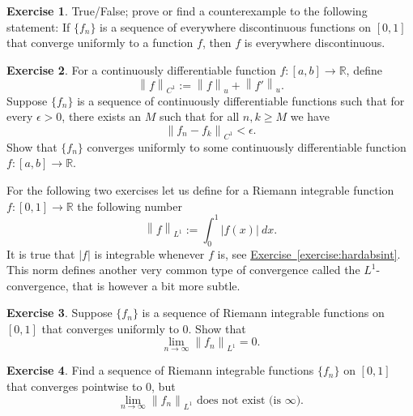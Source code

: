 \documentclass[12pt]{book}
\newcommand{\abs}[1]{\left\lvert {#1} \right\rvert}
\newcommand{\norm}[1]{\left\lVert {#1} \right\rVert}
\newcommand{\R}{{\mathbb{R}}}
\theoremstyle{plain}
\theoremstyle{remark}
\theoremstyle{definition}
\newenvironment{exnote}{\small}{}
\theoremstyle{exercise}
\newtheorem{exercise}{Exercise}[section]
\theoremstyle{example}
\newcommand{\exerciseref}[1]{\hyperref[#1]{Exercise~\ref*{#1}}}
\begin{document}
\begin{exercise}
True/False; prove or find a counterexample to the following statement:
If $\{ f_n \}$ is a sequence of everywhere discontinuous functions on $[0,1]$
that converge uniformly to a function $f$, then $f$ is everywhere
discontinuous.
\end{exercise}

\begin{exercise} \label{c1uniflim:exercise}
For a continuously differentiable function $f \colon [a,b] \to \R$, define
\begin{equation*}
\norm{f}_{C^1} := \norm{f}_u + \norm{f'}_u .
\end{equation*}
Suppose $\{ f_n \}$ is a sequence of continuously differentiable
functions such that for every $\epsilon >0$, there exists an $M$
such that for all $n,k \geq M$ we have
\begin{equation*}
\norm{f_n-f_k}_{C^1} < \epsilon .
\end{equation*}
Show that $\{ f_n \}$ converges uniformly to some continuously differentiable
function $f \colon [a,b] \to \R$.
\end{exercise}

\begin{exnote}
For the following two exercises let us define for a Riemann integrable
function $f \colon [0,1] \to
\R$ the following number
\begin{equation*}
\norm{f}_{L^1} := 
\int_0^1 \abs{f(x)}~dx .
\end{equation*}
It is true that $\abs{f}$ is integrable whenever $f$ is, see
\exerciseref{exercise:hardabsint}.
This norm defines another very common type of
convergence called the $L^1$-convergence, that is however a bit more
subtle.
\end{exnote}

\begin{exercise}
Suppose $\{ f_n \}$ is a sequence of Riemann integrable functions on $[0,1]$
that converges uniformly
to $0$.  Show that
\begin{equation*}
\lim_{n\to\infty} \norm{f_n}_{L^1} = 0 .
\end{equation*}
\end{exercise}

\begin{exercise}
Find a sequence of Riemann integrable functions 
$\{ f_n \}$ on $[0,1]$ that converges pointwise to $0$, but
\begin{equation*}
\lim_{n\to\infty} \norm{f_n}_{L^1} \text{ does not exist (is $\infty$).}
\end{equation*}
\end{exercise}
\end{document}

